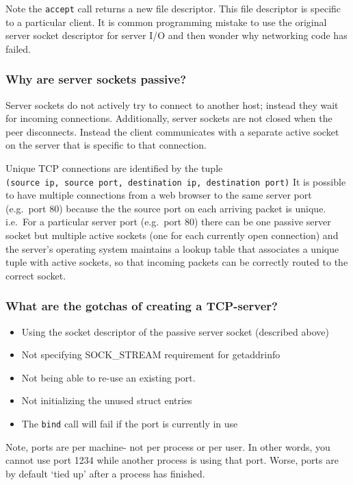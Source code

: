 \documentclass[]{article}
\begin{document}
Note the \texttt{accept} call returns a new file descriptor. This file
descriptor is specific to a particular client. It is common programming
mistake to use the original server socket descriptor for server I/O and
then wonder why networking code has failed.

\subsubsection{Why are server sockets
passive?}\label{why-are-server-sockets-passive}

Server sockets do not actively try to connect to another host; instead
they wait for incoming connections. Additionally, server sockets are not
closed when the peer disconnects. Instead the client communicates with a
separate active socket on the server that is specific to that
connection.

Unique TCP connections are identified by the tuple
\texttt{(source\ ip,\ source\ port,\ destination\ ip,\ destination\ port)}
It is possible to have multiple connections from a web browser to the
same server port (e.g.~port 80) because the the source port on each
arriving packet is unique. i.e.~For a particular server port (e.g.~port
80) there can be one passive server socket but multiple active sockets
(one for each currently open connection) and the server's operating
system maintains a lookup table that associates a unique tuple with
active sockets, so that incoming packets can be correctly routed to the
correct socket.

\subsubsection{What are the gotchas of creating a
TCP-server?}\label{what-are-the-gotchas-of-creating-a-tcp-server}

\begin{itemize}
\item
  Using the socket descriptor of the passive server socket (described
  above)
\item
  Not specifying SOCK\_STREAM requirement for getaddrinfo
\item
  Not being able to re-use an existing port.
\item
  Not initializing the unused struct entries
\item
  The \texttt{bind} call will fail if the port is currently in use
\end{itemize}

Note, ports are per machine- not per process or per user. In other
words, you cannot use port 1234 while another process is using that
port. Worse, ports are by default `tied up' after a process has
finished.
\end{document}
